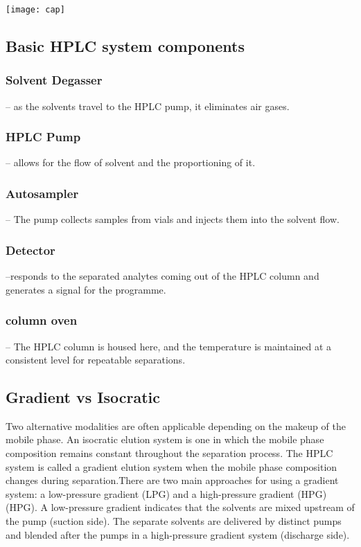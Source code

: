 \documentclass[12pt]{article}
\begin{document}
\texttt{[image: cap]}


\subsection{Basic HPLC system components}



\subsubsection{Solvent Degasser} – as the solvents travel to the HPLC pump, it eliminates air gases.

\subsubsection{HPLC Pump} – allows for the flow of solvent and the proportioning of it.

\subsubsection{ Autosampler} – The pump collects samples from vials and injects them into the solvent flow.

\subsubsection{Detector} –responds to the separated analytes coming out of the HPLC column and generates a signal for the programme.

 \subsubsection{column oven}  – The HPLC column is housed here, and the temperature is maintained at a consistent level for repeatable separations.

\subsection{Gradient vs Isocratic}

Two alternative modalities are often applicable depending on the makeup of the mobile phase. An isocratic elution system is one in which the mobile phase composition remains constant throughout the separation process. The HPLC system is called a gradient elution system when the mobile phase composition changes during separation.There are two main approaches for using a gradient system: a low-pressure gradient (LPG) and a high-pressure gradient (HPG) (HPG). A low-pressure gradient indicates that the solvents are mixed upstream of the pump (suction side). The separate solvents are delivered by distinct pumps and blended after the pumps in a high-pressure gradient system (discharge side).
\end{document}
